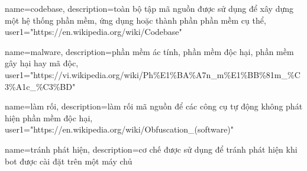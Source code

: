 
{
	name={codebase},
	description={toàn bộ tập mã nguồn được sử dụng để xây dựng một hệ thống phần mềm, ứng dụng hoặc thành phần phần mềm cụ thể},
	user1={"https://en.wikipedia.org/wiki/Codebase"}
}

{
	name={malware},
	description={phần mềm ác tính, phần mềm độc hại, phần mềm gây hại hay mã độc},
	user1={"https://vi.wikipedia.org/wiki/Ph\%E1\%BA\%A7n_m\%E1\%BB\%81m_\%C3\%A1c_\%C3\%BD"}
}

{
	name={làm rối},
	description={làm rối mã nguồn để các công cụ tự động không phát hiện phần mềm độc hại},
	user1={"https://en.wikipedia.org/wiki/Obfuscation_(software)"}
}

{
	name={tránh phát hiện},
	description={cơ chế được sử dụng để tránh phát hiện khi bot được cài đặt trên một máy chủ}
}

